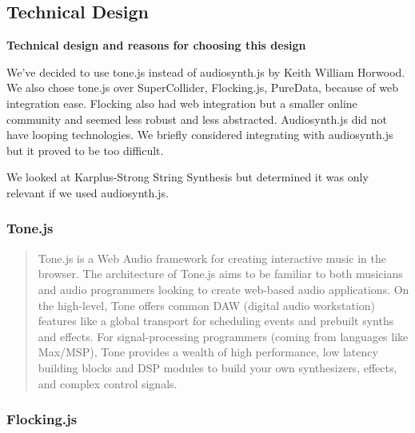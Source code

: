 \documentclass[12pt,a4paper]{article}
\begin{document}
\subsection{Technical Design}
\textbf{Technical design and reasons for choosing this design}

We've decided to use tone.js instead of audiosynth.js by Keith William Horwood. We also chose tone.js over SuperCollider, Flocking.js, PureData, because of web integration ease. Flocking also had web integration but a smaller online community and seemed less robust and less abstracted. Audiosynth.js did not have looping technologies. We briefly considered integrating with audiosynth.js but it proved to be too difficult.

We looked at Karplus-Strong String Synthesis but determined it was only relevant if we used audiosynth.js.

\subsubsection{Tone.js}

\begin{quote}
Tone.js is a Web Audio framework for creating interactive music in the browser. The architecture of Tone.js aims to be familiar to both musicians and audio programmers looking to create web-based audio applications. On the high-level, Tone offers common DAW (digital audio workstation) features like a global transport for scheduling events and prebuilt synths and effects. For signal-processing programmers (coming from languages like Max/MSP), Tone provides a wealth of high performance, low latency building blocks and DSP modules to build your own synthesizers, effects, and complex control signals. \cite{tonejs}
\end{quote}

\subsubsection{Flocking.js}
\end{document}
